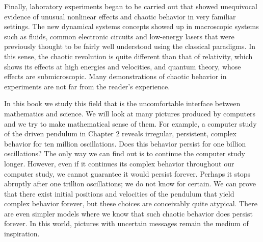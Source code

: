 \documentclass[12pt]{article}
\begin{document}
Finally, laboratory experiments began to be carried out that showed unequivocal evidence of unusual 
nonlinear effects and chaotic behavior in very familiar settings. The new dynamical systems concepts showed 
up in macroscopic systems such as fluids, common electronic circuits and low-energy lasers that were 
previously thought to be fairly well understood using the classical paradigms. In this sense, the chaotic 
revolution is quite different than that of relativity, which shows its effects at high energies and 
velocities, and quantum theory, whose effects are submicroscopic. Many demonstrations of chaotic behavior 
in experiments are not far from the reader’s experience.

In this book we study this field that is the uncomfortable interface between mathematics and science. We 
will look at many pictures produced by computers and we try to make mathematical sense of them. For 
example, a computer study of the driven pendulum in Chapter 2 reveals irregular, persistent, complex 
behavior for ten million oscillations. Does this behavior persist for one billion oscillations? The only 
way we can find out is to continue the computer study longer. However, even if it continues its complex 
behavior throughout our computer study, we cannot guarantee it would persist forever. Perhaps it stops 
abruptly after one trillion oscillations; we do not know for certain. We can prove that there exist initial 
positions and velocities of the pendulum that yield complex behavior forever, but these choices are 
conceivably quite atypical. There are even simpler models where we know that such chaotic behavior does 
persist forever. In this world, pictures with uncertain messages remain the medium of inspiration.
\end{document}
